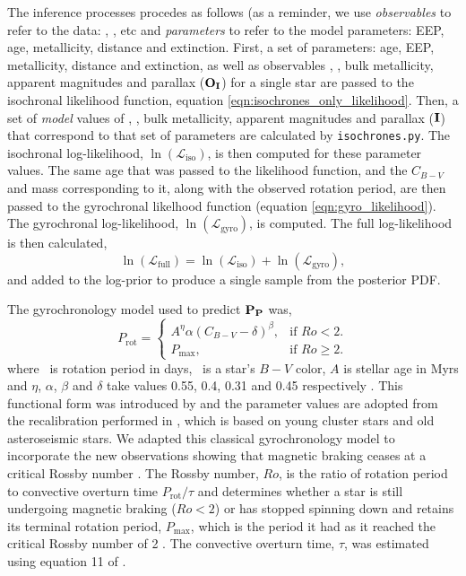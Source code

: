 The inference processes procedes as follows (as a reminder, we use {\it
observables} to refer to the data: \teff, \logg, etc and {\it parameters} to
refer to the model parameters: EEP, age, metallicity, distance and extinction.
First, a set of parameters: age, EEP, metallicity, distance and extinction, as
well as observables \teff, \logg, bulk metallicity, apparent magnitudes and
parallax (${\bf O_I}$) for a single star are passed to the isochronal
likelihood function, equation \eqref{eqn:isochrones_only_likelihood}.
Then, a set of {\it model} values of \teff, \logg, bulk metallicity, apparent
magnitudes and parallax (${\bf I}$) that correspond to that set of parameters
are calculated by {\tt isochrones.py}.
The isochronal log-likelihood, $\ln(\mathcal{L}_{\mathrm{iso}})$, is then
computed for these parameter values.
The same age that was passed to the likelihood function, and the $C_{B-V}$ and
mass corresponding to it, along with the observed rotation period, are then
passed to the gyrochronal likelhood function (equation
\ref{eqn:gyro_likelihood}).
The gyrochronal log-likelihood, $\ln(\mathcal{L}_{\mathrm{gyro}})$, is
computed.
The full log-likelihood is then calculated,
\begin{equation} \label{eqn:both_likelihood}
\ln(\mathcal{L}_{\mathrm{full}})
= \ln(\mathcal{L}_{\mathrm{iso}}) + \ln(\mathcal{L}_{\mathrm{gyro}}),
\end{equation}
and added to the log-prior to produce a single sample from the posterior PDF.

The gyrochronology model used to predict $\bf{P_P}$ was,
\begin{equation}
    P_\mathrm{rot} =\begin{cases}
        A^\eta \alpha (C_{B-V} - \delta)^\beta, & \text{if $Ro < 2$}. \\
        P_{\mathrm{max}}, & \text{if $Ro \geq 2$}.
    \end{cases}
\label{eqn:gyro}
\end{equation}
where \prot\ is rotation period in days, \cbv\ is a star's $B-V$ color, $A$ is
stellar age in Myrs and $\eta$, $\alpha$, $\beta$ and $\delta$ take values
0.55, 0.4, 0.31 and 0.45 respectively \citep{angus2015}.
This functional form was introduced by \citep{barnes2007} and the parameter
values are adopted from the recalibration performed in \citet{angus2015},
which is based on young cluster stars and old asteroseismic stars.
We adapted this classical gyrochronology model to incorporate the new
observations showing that magnetic braking ceases at a critical Rossby number
\citep{vansaders2016}.
The Rossby number, $Ro$, is the ratio of rotation period to convective
overturn time $P_{\mathrm{rot}}/\tau$ and determines whether a star is still
undergoing magnetic braking ($Ro < 2$) or has stopped spinning down and
retains its terminal rotation period, $P_\mathrm{max}$, which is the period it
had as it reached the critical Rossby number of 2 \citep{vansaders2016}.
The convective overturn time, $\tau$, was estimated using equation 11 of
\citet{wright2011}.

